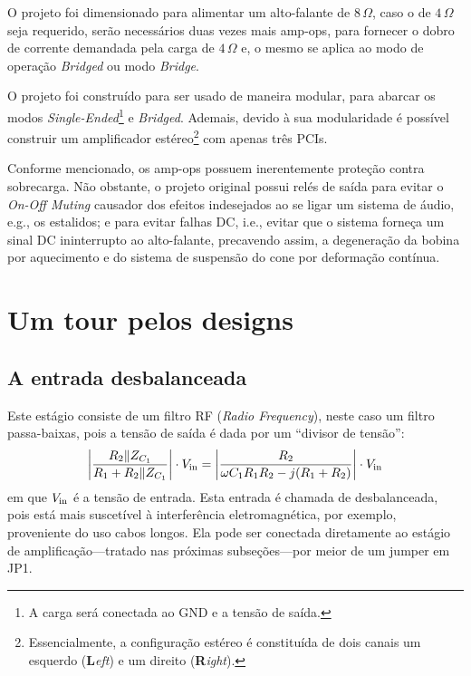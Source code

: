 \documentclass[12pt, a4paper, leqno, twoside]{book}
\def\ohm{\,\Omega}
\def\ampop{amp-op}
\begin{document}
  O projeto foi dimensionado para alimentar um alto-falante de $8\ohm$, caso o de $4\ohm$ seja requerido, ser\~ao necess\'arios duas vezes mais \ampop{s}, para fornecer o dobro de corrente demandada pela carga de $4\ohm$ e, o mesmo se aplica ao modo de opera\c c\~ao {\it Bridged\/} ou modo {\it Bridge}.

  O projeto foi constru\'ido para ser usado de maneira modular, para abarcar os modos {\it Single-Ended\/}\footnote{A carga ser\'a conectada ao GND e a tens\~ao de sa\'ida.} e {\it Bridged}. Ademais, devido \`a sua modularidade \'e poss\'ivel construir um amplificador est\'ereo\footnote{Essencialmente, a configura\c c\~ao est\'ereo \'e constitu\'ida de dois canais um esquerdo ({\bf L}{\it eft}) e um direito ({\bf R}{\it ight}).} com apenas tr\^es PCIs.

  Conforme mencionado, os \ampop{s} possuem inerentemente prote\c c\~ao contra sobrecarga. N\~ao obstante, o projeto original possui rel\'es de sa\'ida para evitar o {\it On-Off Muting} causador dos efeitos indesejados ao se ligar um sistema de \'audio, e.g., os estalidos; e para evitar falhas DC, i.e., evitar que o sistema forneça um sinal DC ininterrupto ao alto-falante, precavendo assim, a degenera\c c\~ao da bobina por aquecimento e do sistema de suspens\~ao do cone por deforma\c c\~ao cont\'inua. 
  \section{Um tour pelos designs}
  \subsection{A entrada desbalanceada}

  Este est\'agio consiste de um filtro RF ({\it Radio Frequency\/}), neste caso um filtro passa-baixas, pois a tens\~ao de sa\'ida \'e dada por um ``divisor de tens\~ao'':
  \begin{equation}
    \bigg|{R_2\|Z_{C_1}\over R_1+R_2\|Z_{C_1}}\bigg|\cdot V_{\rm in}=\bigg|{R_2\over\omega C_1R_1R_2-j(R_1+R_2)}\bigg|\cdot V_{\rm in}
  \end{equation}
  em que $V_{\rm in}$ \'e a tens\~ao de entrada. Esta entrada \'e chamada de desbalanceada, pois est\'a mais suscet\'ivel \`a interfer\^encia eletromagn\'etica, por exemplo, proveniente do uso cabos longos. Ela pode ser conectada diretamente ao est\'agio de amplifica\c c\~ao---tratado nas pr\'oximas subse\c c\~oes---por meior de um jumper em JP1. 
\end{document}

